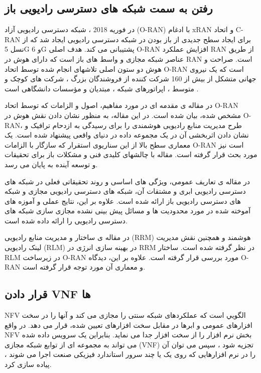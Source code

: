 \subsection{رفتن به سمت شبکه های دسترسی رادیویی باز}
در فوریه 2018 ، شبکه دسترسی رادیویی آزاد (O-RAN) با ادغام  xRAN و اتحاد C-RAN برای ایجاد سطح جدیدی از باز بودن در شبکه دسترسی رادیویی ایجاد شد که از نسل 5G و 6G پشتیبانی می کند.
هدف اصلی O-RAN افزایش عملکرد RAN از طریق عناصر شبکه مجازی و واسط های باز است که دارای هوش در RAN است.
صراحت و هوش دو ستون اصلی تلاشهای انجام شده توسط اتحاد O-RAN است که یک نیروی جهانی متشکل از بیش از 160 شرکت کننده از فروشندگان بزرگ ، شرکت های کوچک و متوسط ، اپراتورهای شبکه ، مبتدیان و مؤسسات دانشگاهی است
\cite{oranpaper}
.

در مقاله ی 
\cite{oranInt}
 مقدمه ای در مورد مفاهیم، اصول و الزامات  که توسط اتحاد O-RAN مشخص شده، بیان شده است.
 در این مقاله،
 به منظور نشان دادن نقش هوش در O-RAN، طرح مدیریت منابع رادیویی هوشمندی را برای رسیدگی به ازدحام ترافیک و نشان دادن اثربخشی آن در یک مجموعه داده در دنیای واقعی پیشنهاد شده است.
 یک معماری سطح بالا از این سناریوی استقرار که سازگار با الزامات O-RAN است نیز مورد بحث قرار گرفته است. مقاله با چالشهای کلیدی فنی و مشکلات باز برای تحقیقات و توسعه آینده به پایان می رسد.
 
در مقاله ی
\cite{c2o}
تعاریف عمومی، ویژگی های اساسی و روند تحقیقاتی فعلی در شبکه های دسترسی رادیویی ابری و مشتقات آن، شبکه های دسترسی رادیویی مجازی و شبکه های دسترسی رادیویی باز ارائه شده است.
علاوه بر این، نتایج عملی و آموزه های آموخته شده در مورد محدودیت ها و مسائل پیش بینی نشده مجازی سازی شبکه های دسترسی رادیویی را ارائه داده شده است.

در مقاله ی 
\cite{sree2019open, kawahara2019ran}
 ساختار و مدیریت منابع رادیویی (RRM) هوشمند 
 و همچنین نقش مدیریت لینک رادیویی (RLM) در بهینه سازی انرژی در RRM
در نظر گرفته شده است.
ساختار RLM در 
زیرساخت O-RAN مورد بررسی قرار گرفته است.
علاوه بر این، دیدگاه
O-RAN
 و معماری آن مورد توجه قرار گرفته است.
\subsection{قرار دادن VNF ها}
NFV
 الگویي است که عملکردهای شبکه سنتی را مجازی می کند و آنها را در سخت افزارهای عمومی و ابرها در مقابل سخت افزارهای تعیین شده، قرار می دهد.
 در واقع NFV بخش نرم افزار را از سخت افزار جدا می نماید.
 بنابراین یک سرویس داده شده می تواند به مجموعه ای از توابع شبکه مجازی (VNF) تجزیه شود ، سپس می توان آن را در نرم افزارهایی که روی یک یا چند سرور استاندارد فیزیکی صنعت اجرا می شوند ، پیاده سازی کرد.
 
